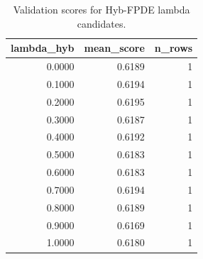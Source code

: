 \begin{table}[t]
\caption{Validation scores for Hyb-FPDE lambda candidates.}
\label{tab:lambda_distribution_computed}
\centering
\begin{tabular}{rrr}
\toprule
lambda\_hyb & mean\_score & n\_rows \\
\midrule
0.0000 & 0.6189 & 1 \\
0.1000 & 0.6194 & 1 \\
0.2000 & 0.6195 & 1 \\
0.3000 & 0.6187 & 1 \\
0.4000 & 0.6192 & 1 \\
0.5000 & 0.6183 & 1 \\
0.6000 & 0.6183 & 1 \\
0.7000 & 0.6194 & 1 \\
0.8000 & 0.6189 & 1 \\
0.9000 & 0.6169 & 1 \\
1.0000 & 0.6180 & 1 \\
\bottomrule
\end{tabular}

\end{table}

